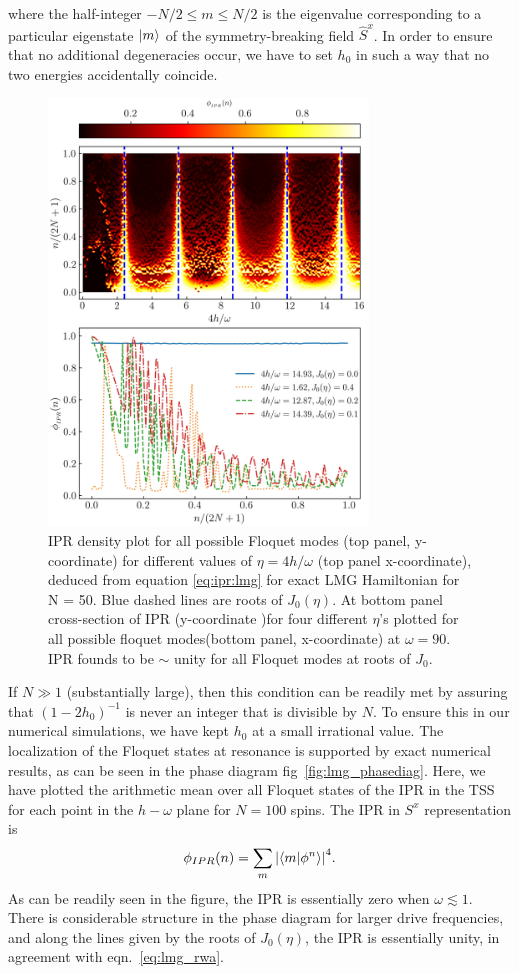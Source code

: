 \documentclass[%
reprint,
superscriptaddress,
amsmath,amssymb,
aps,
prb,
showkeys,
]{revtex4-2}
\begin{document}
where the half-integer $-N/2\leq m \leq N/2$ is the eigenvalue corresponding to a particular eigenstate $\ket{m}$ of the symmetry-breaking field $\hat{S}^x$. In order to ensure that no additional degeneracies occur, we have to set $h_0$ in  such a way that no two energies accidentally coincide.
	\begin{figure}[t!]
	\centering
	\includegraphics[width = 8.5cm]{ipr_exact_dynm_N50_frq_90_.jpeg}
	\caption{IPR density plot for all possible Floquet modes (top panel, y-coordinate) for different values of $\eta = 4h/\omega$ (top panel x-coordinate), deduced from equation \ref{eq:ipr:lmg} for exact LMG Hamiltonian for N = 50. Blue dashed lines are roots of $J_0(\eta)$. At bottom panel cross-section of IPR (y-coordinate )for four different $\eta$'s plotted for all possible floquet modes(bottom panel, x-coordinate) at $\omega=90$. IPR founds to be $\sim$ unity for all Floquet modes at roots of $J_0$.}
	\label{fig:lmg_ipr_exact}
\end{figure}
If $N\gg 1$ (substantially large), then this condition can be readily met by assuring that $(1-2h_0)^{-1}$ is never an integer that is divisible by $N$. To ensure this in our numerical simulations, we have kept $h_0$ at a small irrational value.
	The localization of the Floquet states at resonance is supported by exact numerical results, as can be seen in the phase diagram fig~\ref{fig:lmg_phasediag}. Here, we have plotted the arithmetic mean over all Floquet states of the IPR 
	in the TSS for each point in the $h-\omega$ plane for $N=100$ spins.  The IPR in $S^x$ representation is
	\begin{equation}
		\phi_{IPR}(n) = \sum_m \abs{\ip{m}{\phi^n}}^4.
		\label{eq:ipr:lmg}
	\end{equation}
	As can be readily seen in the figure, the IPR is essentially zero when  $\omega \lesssim 1$. There is considerable structure in the phase diagram for larger drive frequencies, and along the lines given by the roots of $J_0(\eta)$, the IPR is essentially unity, in agreement with eqn.~\ref{eq:lmg_rwa}.
	
\end{document}
